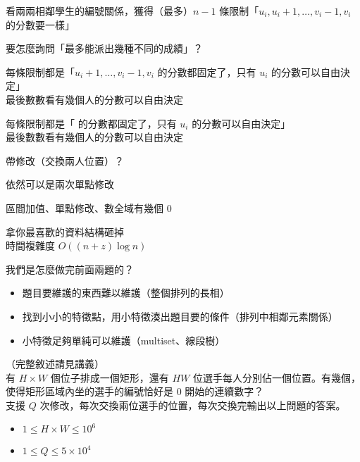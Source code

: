 \begin{frame}{}
    看兩兩相鄰學生的編號關係，獲得（最多）$n - 1$ 條限制「$u_i, u_i + 1, \dots, v_i - 1, v_i$ 的分數要一樣」

     {
        要怎麼詢問「最多能派出幾種不同的成績」？
    }

     {
        每條限制都是「$u_i + 1, \dots, v_i - 1, v_i$ 的分數都固定了，只有 $u_i$ 的分數可以自由決定」\\
        最後數數看有幾個人的分數可以自由決定
    }

     {
        每條限制都是「 的分數都固定了，只有 $u_i$ 的分數可以自由決定」\\
        最後數數看有幾個人的分數可以自由決定

    }
\end{frame}

\begin{frame}{}
    帶修改（交換兩人位置）？
    
    依然可以是兩次單點修改
\end{frame}

\begin{frame}{}
    區間加值、單點修改、數全域有幾個 $0$

    拿你最喜歡的資料結構砸掉 \\
    時間複雜度 $O((n + z) \log n)$
\end{frame}

\begin{frame}{\ebtitle}
    我們是怎麼做完前面兩題的？

    \begin{itemize}
        \item 題目要維護的東西難以維護（整個排列的長相）
        \item 找到小小的特徵點，用小特徵湊出題目要的條件（排列中相鄰元素關係）
        \item 小特徵足夠單純可以維護（multiset、線段樹）
    \end{itemize}
\end{frame}

\begin{frame}{}
    \begin{problem}
        （完整敘述請見講義）\\

        有 $H \times W$ 個位子排成一個矩形，還有 $HW$ 位選手每人分別佔一個位置。有幾個，使得矩形區域內坐的選手的編號恰好是 $0$ 開始的連續數字？\\

        支援 $Q$ 次修改，每次交換兩位選手的位置，每次交換完輸出以上問題的答案。\\

        \begin{itemize}
            \item $1 \le H \times W \le 10^6$
            \item $1 \le Q \le 5 \times 10^4$
        \end{itemize}
    \end{problem}
\end{frame}

